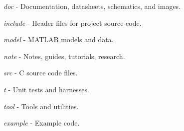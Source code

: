 
\begin{DoxyItemize}
\item {\itshape doc} -\/ Documentation, datasheets, schematics, and images.
\item {\itshape include} -\/ Header files for project source code.
\item {\itshape model} -\/ M\-A\-T\-L\-A\-B models and data.
\item {\itshape note} -\/ Notes, guides, tutorials, research.
\item {\itshape src} -\/ C source code files.
\item {\itshape t} -\/ Unit tests and harnesses.
\item {\itshape tool} -\/ Tools and utilities.
\item {\itshape example} -\/ Example code. 
\end{DoxyItemize}
